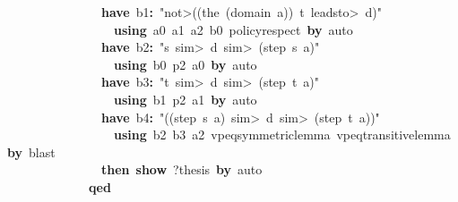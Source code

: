 \documentclass{article}
\newcommand{\syntaxKEYWORDA}[1]{\textcolor[rgb]{0.0,0.4,0.6}{\textbf{#1}}}
\newcommand{\syntaxKEYWORDC}[1]{\textcolor[rgb]{0.0,0.6,1.0}{\textbf{#1}}}
\newcommand{\syntaxLITERALA}[1]{\textcolor[rgb]{1.0,0.0,0.8}{#1}}
\newcommand{\syntaxOPERATOR}[1]{\textcolor[rgb]{0.0,0.0,0.0}{\textbf{#1}}}
\newcommand{\syntaxKEYWORDA}[1]{\textcolor[rgb]{0.0,0.4,0.6}{\textbf{#1}}}
\newcommand{\syntaxKEYWORDC}[1]{\textcolor[rgb]{0.0,0.6,1.0}{\textbf{#1}}}
\newcommand{\syntaxLITERALA}[1]{\textcolor[rgb]{1.0,0.0,0.8}{#1}}
\newcommand{\syntaxOPERATOR}[1]{\textcolor[rgb]{0.0,0.0,0.0}{\textbf{#1}}}
\newcommand{\syntaxKEYWORDA}[1]{\textcolor[rgb]{0.0,0.4,0.6}{\textbf{#1}}}
\newcommand{\syntaxKEYWORDC}[1]{\textcolor[rgb]{0.0,0.6,1.0}{\textbf{#1}}}
\newcommand{\syntaxLITERALA}[1]{\textcolor[rgb]{1.0,0.0,0.8}{#1}}
\newcommand{\syntaxOPERATOR}[1]{\textcolor[rgb]{0.0,0.0,0.0}{\textbf{#1}}}
\newcommand{\syntaxKEYWORDA}[1]{\textcolor[rgb]{0.0,0.4,0.6}{#1}}
\newcommand{\syntaxKEYWORDC}[1]{\textcolor[rgb]{0.0,0.6,1.0}{#1}}
\newcommand{\syntaxLITERALA}[1]{\textcolor[rgb]{1.0,0.0,0.8}{\textbf{#1}}}
\newcommand{\syntaxOPERATOR}[1]{\textcolor[rgb]{0.0,0.0,0.0}{#1}}
\newcommand{\syntaxKEYWORDA}[1]{\textcolor[rgb]{0.0,0.4,0.6}{\textbf{#1}}}
\newcommand{\syntaxKEYWORDC}[1]{\textcolor[rgb]{0.0,0.6,1.0}{\textbf{#1}}}
\newcommand{\syntaxLITERALA}[1]{\textcolor[rgb]{1.0,0.0,0.8}{#1}}
\newcommand{\syntaxOPERATOR}[1]{\textcolor[rgb]{0.0,0.0,0.0}{\textbf{#1}}}
\newcommand{\syntaxKEYWORDA}[1]{\textcolor[rgb]{0.0,0.4,0.6}{\textbf{#1}}}
\newcommand{\syntaxKEYWORDC}[1]{\textcolor[rgb]{0.0,0.6,1.0}{\textbf{#1}}}
\newcommand{\syntaxLITERALA}[1]{\textcolor[rgb]{1.0,0.0,0.8}{#1}}
\newcommand{\syntaxOPERATOR}[1]{\textcolor[rgb]{0.0,0.0,0.0}{\textbf{#1}}}
\begin{document}
{\ }{\ }{\ }{\ }{\ }{\ }{\ }{\ }{\ }{\ }{\ }{\ }{\ }{\ }{\ }{\ }\syntaxKEYWORDA{have}{\ }b1\syntaxOPERATOR{:}{\ }\syntaxLITERALA{"\<not>((the{\ }(domain{\ }a)){\ }\usebox{\atbox}{\ }t{\ }\<leadsto>{\ }d)"}\hspace*{\fill}\\
{\ }{\ }{\ }{\ }{\ }{\ }{\ }{\ }{\ }{\ }{\ }{\ }{\ }{\ }{\ }{\ }{\ }{\ }\syntaxKEYWORDA{using}{\ }a0{\ }a1{\ }a2{\ }b0{\ }policy\usebox{\underscorebox}respect{\ }\syntaxKEYWORDA{by}{\ }auto\hspace*{\fill}\\
{\ }{\ }{\ }{\ }{\ }{\ }{\ }{\ }{\ }{\ }{\ }{\ }{\ }{\ }{\ }{\ }\syntaxKEYWORDA{have}{\ }b2\syntaxOPERATOR{:}{\ }\syntaxLITERALA{"s{\ }\<sim>{\ }d{\ }\<sim>{\ }(step{\ }s{\ }a)"}\hspace*{\fill}\\
{\ }{\ }{\ }{\ }{\ }{\ }{\ }{\ }{\ }{\ }{\ }{\ }{\ }{\ }{\ }{\ }{\ }{\ }\syntaxKEYWORDA{using}{\ }b0{\ }p2{\ }a0{\ }\syntaxKEYWORDA{by}{\ }auto\hspace*{\fill}\\
{\ }{\ }{\ }{\ }{\ }{\ }{\ }{\ }{\ }{\ }{\ }{\ }{\ }{\ }{\ }{\ }\syntaxKEYWORDA{have}{\ }b3\syntaxOPERATOR{:}{\ }\syntaxLITERALA{"t{\ }\<sim>{\ }d{\ }\<sim>{\ }(step{\ }t{\ }a)"}\hspace*{\fill}\\
{\ }{\ }{\ }{\ }{\ }{\ }{\ }{\ }{\ }{\ }{\ }{\ }{\ }{\ }{\ }{\ }{\ }{\ }\syntaxKEYWORDA{using}{\ }b1{\ }p2{\ }a1{\ }\syntaxKEYWORDA{by}{\ }auto{\ }{\ }\hspace*{\fill}\\
{\ }{\ }{\ }{\ }{\ }{\ }{\ }{\ }{\ }{\ }{\ }{\ }{\ }{\ }{\ }{\ }\syntaxKEYWORDA{have}{\ }b4\syntaxOPERATOR{:}{\ }\syntaxLITERALA{"((step{\ }s{\ }a){\ }\<sim>{\ }d{\ }\<sim>{\ }(step{\ }t{\ }a))"}\hspace*{\fill}\\
{\ }{\ }{\ }{\ }{\ }{\ }{\ }{\ }{\ }{\ }{\ }{\ }{\ }{\ }{\ }{\ }{\ }{\ }\syntaxKEYWORDA{using}{\ }b2{\ }b3{\ }a2{\ }vpeq\usebox{\underscorebox}symmetric\usebox{\underscorebox}lemma{\ }vpeq\usebox{\underscorebox}transitive\usebox{\underscorebox}lemma{\ }\syntaxKEYWORDA{by}{\ }blast\hspace*{\fill}\\
{\ }{\ }{\ }{\ }{\ }{\ }{\ }{\ }{\ }{\ }{\ }{\ }{\ }{\ }{\ }{\ }\syntaxKEYWORDA{then}{\ }\syntaxKEYWORDC{show}{\ }?thesis{\ }\syntaxKEYWORDA{by}{\ }auto\hspace*{\fill}\\
{\ }{\ }{\ }{\ }{\ }{\ }{\ }{\ }{\ }{\ }{\ }{\ }{\ }{\ }\syntaxKEYWORDA{qed}\hspace*{\fill}\\
\end{document}
